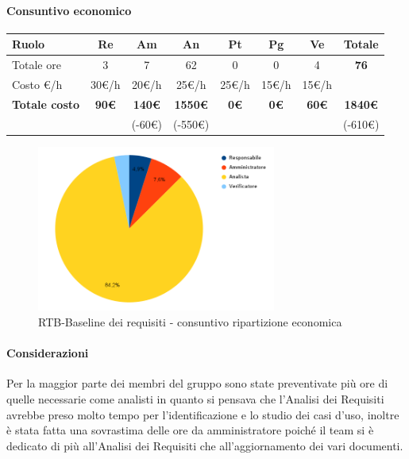 \paragraph{Consuntivo economico}
\begin{center}
	\renewcommand{\arraystretch}{1.8}
	\begin{tabular}{ |m{6em}|c|c|c|c|c|c|c| }
	\hline
	\textbf{Ruolo} & \textbf{Re} & \textbf{Am} &  \textbf{An} &  \textbf{Pt} &  \textbf{Pg} &  \textbf{Ve} &  \textbf{Totale}\\
    \hline
    Totale ore & 3 & 7 & 62 & 0 & 0 & 4 & \textbf{76}\\
    \hline
    Costo \euro/h & 30\euro/h & 20\euro/h & 25\euro/h & 25\euro/h & 15\euro/h & 15\euro/h & \\
    \hline
    \textbf{Totale costo} & \textbf{90\euro} & \textbf{140\euro} &  \textbf{1550\euro} & \textbf{0\euro} &  \textbf{0\euro} &  \textbf{60\euro} &  \textbf{1840\euro} \\
    &  & (-60\euro) & (-550\euro) &  &  &  & (-610\euro) \\
    \hline
	\end{tabular}

    \begin{figure}[H]
        \centering\includegraphics[width=0.7\textwidth, height=0.7\textheight, keepaspectratio]{images/consuntivo/RTB-requisiti-costo.png}
        \caption{RTB-Baseline dei requisiti - consuntivo ripartizione economica}
    \end{figure}
\end{center}

\paragraph{Considerazioni} \hfill \break
Per la maggior parte dei membri del gruppo sono state preventivate più ore di quelle necessarie come analisti in quanto 
si pensava che l'Analisi dei Requisiti avrebbe preso molto tempo per l'identificazione e lo studio dei casi d'uso, inoltre è stata
fatta una sovrastima delle ore da amministratore poiché il team si è dedicato di più all'Analisi dei Requisiti 
che all'aggiornamento dei vari documenti.


